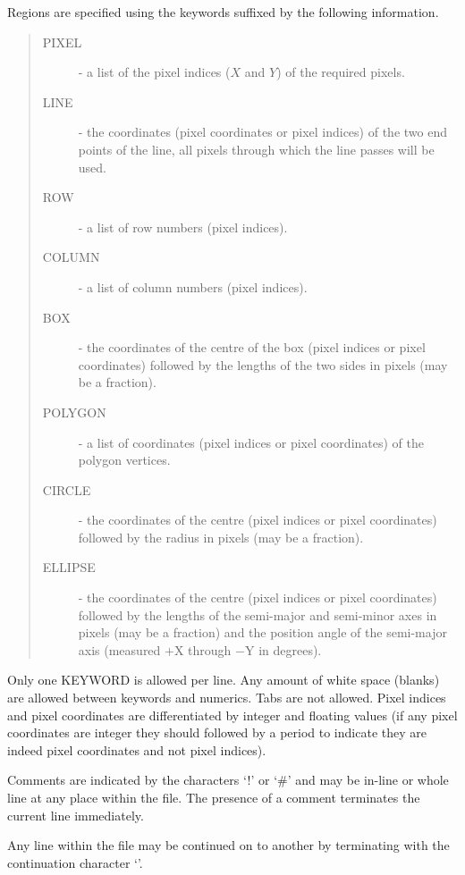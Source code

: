 Regions are specified using the keywords suffixed by the following information.
\begin{quote}
\begin{description}
\item [PIXEL] - a list of the pixel indices ($X$ and $Y$) of the required
                pixels.
\item [LINE] - the coordinates (pixel coordinates or pixel indices) of the
               two end points of the line, all pixels through which the
               line passes will be used.
\item [ROW] - a list of row numbers (pixel indices).
\item [COLUMN] - a list of column numbers (pixel indices).
\item [BOX] - the coordinates of the centre of the box (pixel indices or
              pixel coordinates) followed by the lengths of the two sides
              in pixels (may be a fraction).
\item [POLYGON] - a list of coordinates (pixel indices or pixel coordinates) of 
                 the polygon vertices.
\item [CIRCLE] - the coordinates of the centre (pixel indices or pixel
                 coordinates) followed by the radius in pixels
                 (may be a fraction).
\item [ELLIPSE] - the coordinates of the centre (pixel indices or pixel 
                  coordinates) followed by the lengths of the semi-major and 
                  semi-minor axes in pixels (may be a fraction) and the position
                  angle of the semi-major axis (measured $+$X through $-$Y in 
                  degrees).
\end{description}
\end{quote}

Only one KEYWORD is allowed per line. Any amount of white space (blanks)
are allowed between keywords and numerics. Tabs are not allowed. Pixel
indices and pixel coordinates are differentiated by integer and floating
values (if any pixel coordinates are integer they should followed by a
period to indicate they are indeed pixel coordinates and not pixel
indices).

Comments are indicated by the characters `!' or `\#' and may be in-line
or whole line at any place within the file. The presence of a comment
terminates the current line immediately.

Any line within the file may be continued on to another by terminating
with the continuation character `\myverb{-}'.

